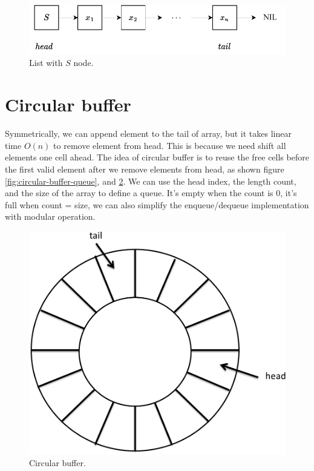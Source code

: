 \documentclass[b5paper]{article}
\begin{document}
\begin{figure}[htbp]
  \centering
  \includegraphics[scale=0.8]{img/slistq}
  \caption{List with $S$ node.}
  \label{fig:list-queue}
\end{figure}

\section{Circular buffer}

Symmetrically, we can append element to the tail of array, but it takes linear time $O(n)$ to remove element from head. This is because we need shift all elements one cell ahead. The idea of circular buffer is to reuse the free cells before the first valid element after we remove elements from head, as shown figure \cref{fig:circular-buffer-queue}, and \cref{fig:circular-buffer}. We can use the head index, the length count, and the size of the array to define a queue. It's empty when the count is 0, it's full when count = size, we can also simplify the enqueue/dequeue implementation with modular operation.

\begin{figure}[htbp]
 \centering
 \includegraphics[scale=0.3]{img/ring-buffer}
 \caption{Circular buffer.}
 \label{fig:circular-buffer}
\end{figure}
\end{document}
